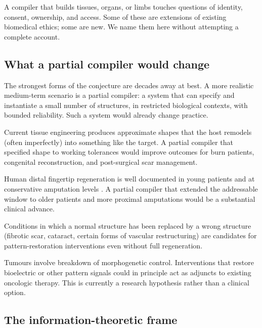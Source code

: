  A compiler that builds tissues,
organs, or limbs touches questions of identity, consent, ownership,
and access. Some of these are extensions of existing biomedical
ethics; some are new. We name them here without attempting a complete
account.

\subsection{What a partial compiler would change}

The strongest forms of the conjecture are decades away at best. A more
realistic medium-term scenario is a partial compiler: a system that can
specify and instantiate a small number of structures, in restricted
biological contexts, with bounded reliability. Such a system would
already change practice.

 Current tissue
engineering produces approximate shapes that the host remodels (often
imperfectly) into something like the target. A partial compiler that
specified shape to working tolerances would improve outcomes for burn
patients, congenital reconstruction, and post-surgical scar management.

 Human distal fingertip regeneration
is well documented in young patients and at conservative amputation
levels \cite{paper:v6c13-illingworth-digit-1974}. A partial compiler
that extended the addressable window to older patients and more
proximal amputations would be a substantial clinical advance.

Conditions in which a normal structure has been replaced by a wrong
structure (fibrotic scar, cataract, certain forms of vascular
restructuring) are candidates for pattern-restoration interventions
even without full regeneration.

 Tumours involve
breakdown of morphogenetic control. Interventions that restore
bioelectric or other pattern signals could in principle act as
adjuncts to existing oncologic therapy. This is currently a research
hypothesis rather than a clinical option.

\subsection{The information-theoretic frame}

